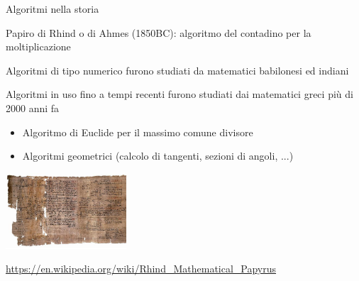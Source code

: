 \begin{frame}{Algoritmi nella storia}
\BIL
\item Papiro di Rhind o di Ahmes (1850BC): algoritmo del contadino per la moltiplicazione
\item Algoritmi di tipo numerico furono studiati da matematici babilonesi ed indiani
\item Algoritmi in uso fino a tempi recenti furono studiati dai matematici greci più di 2000 anni fa
\begin{itemize}
\item Algoritmo di Euclide per il massimo comune divisore
\item Algoritmi geometrici (calcolo di tangenti, sezioni di angoli, ...)
\EIL
\end{itemize}

\begin{center}
\includegraphics[width=4.5cm]{papyrus.jpg}
\end{center}
\tiny
\url{https://en.wikipedia.org/wiki/Rhind_Mathematical_Papyrus}
\end{frame}

